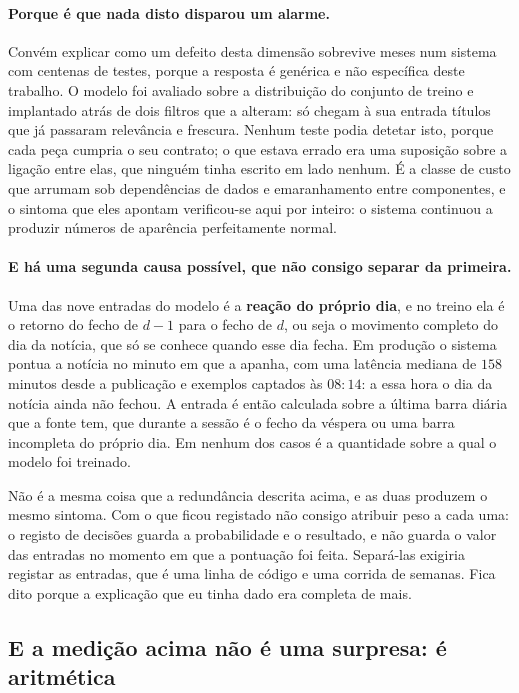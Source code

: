 \paragraph{Porque é que nada disto disparou um alarme.}
Convém explicar como um defeito desta dimensão sobrevive meses num sistema com centenas de testes,
porque a resposta é genérica e não específica deste trabalho. O modelo foi avaliado sobre a
distribuição do conjunto de treino e implantado atrás de dois filtros que a alteram: só chegam à
sua entrada títulos que já passaram relevância e frescura. Nenhum teste podia detetar isto, porque
cada peça cumpria o seu contrato; o que estava errado era uma suposição sobre a ligação entre elas,
que ninguém tinha escrito em lado nenhum. É a classe de custo que \textcite{sculley2015debt}
arrumam sob dependências de dados e emaranhamento entre componentes, e o sintoma que eles apontam verificou-se aqui
por inteiro: o sistema continuou a produzir números de aparência perfeitamente normal.

\paragraph{E há uma segunda causa possível, que não consigo separar da primeira.}
\label{sec:av_ret_event_producao}
Uma das nove entradas do modelo é a \textbf{reação do próprio dia}, e no treino ela é o retorno do
fecho de $d-1$ para o fecho de $d$, ou seja o movimento completo do dia da notícia, que só se
conhece quando esse dia fecha. Em produção o sistema pontua a notícia no minuto em que a apanha,
com uma latência mediana de $158$ minutos desde a publicação e exemplos captados às
$08{:}14$: a essa hora o dia da notícia ainda não fechou. A entrada é então calculada sobre a
última barra diária que a fonte tem, que durante a sessão é o fecho da véspera ou uma barra
incompleta do próprio dia. Em nenhum dos casos é a quantidade sobre a qual o modelo foi treinado.

Não é a mesma coisa que a redundância descrita acima, e as duas produzem o mesmo sintoma. Com o
que ficou registado não consigo atribuir peso a cada uma: o registo de decisões guarda a
probabilidade e o resultado, e não guarda o valor das entradas no momento em que a pontuação foi
feita. Separá-las exigiria registar as entradas, que é uma linha de código e uma corrida de
semanas. Fica dito porque a explicação que eu tinha dado era completa de mais.

\subsection{E a medição acima não é uma surpresa: é aritmética}
\label{sec:av_inevitavel}

